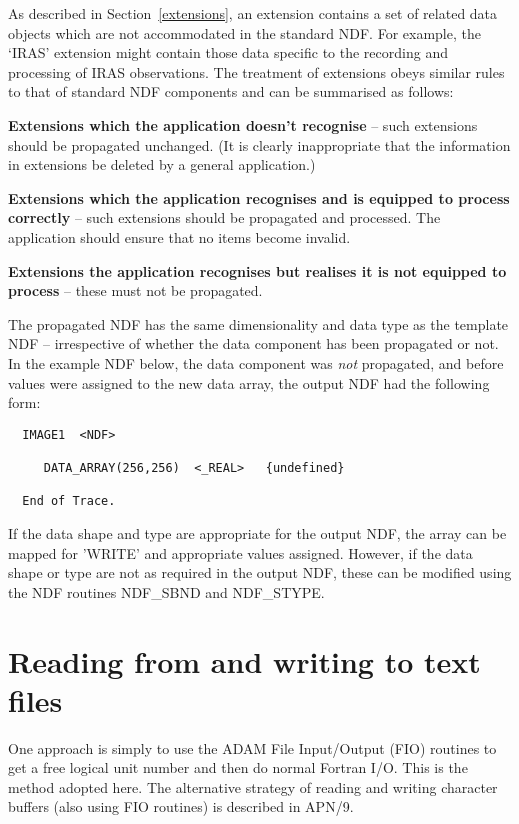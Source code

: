 As described in Section~\ref{extensions}, an extension contains a set of 
related data objects which are not accommodated in the standard NDF.
For example, the `IRAS' extension might contain those data specific to
the recording and processing of IRAS observations.
The treatment of extensions obeys similar rules to that of standard 
NDF components and can be summarised as follows:
\begin{description}
\item {\bf Extensions which the application doesn't recognise} -- such 
extensions should be propagated unchanged. 
(It is clearly inappropriate that the information in extensions 
be deleted by a general application.)


\item {\bf Extensions which the application recognises and is equipped to 
process correctly} -- such extensions should be propagated and processed.
The application should ensure that no items become invalid.

\item {\bf Extensions the application recognises but realises it is not 
equipped to process} -- these must not be propagated.
\end{description}

The propagated NDF has the same dimensionality and data type as the 
template NDF -- irrespective of whether the data component has been 
propagated or not.
In the example NDF below, the data component was {\sl not\/} propagated,
and before values were assigned to the new data array, the 
output NDF had the following form:
\begin{verbatim}
  IMAGE1  <NDF>

     DATA_ARRAY(256,256)  <_REAL>   {undefined}

  End of Trace.
\end{verbatim}
If the data shape and type are appropriate for the output NDF, the array
can be mapped for 'WRITE' and appropriate values assigned.
However, if the data shape or type are not as required in 
the output NDF, these can be modified using the NDF routines NDF\_SBND
and NDF\_STYPE.

\newpage
\section{Reading from and writing to text files\label{rddata}}

One approach is simply to use the ADAM File Input/Output 
(FIO) routines to get a free logical unit number and then do normal Fortran I/O.
This is the method adopted here. The alternative strategy of reading
and writing character buffers (also using FIO routines) is described in APN/9.


